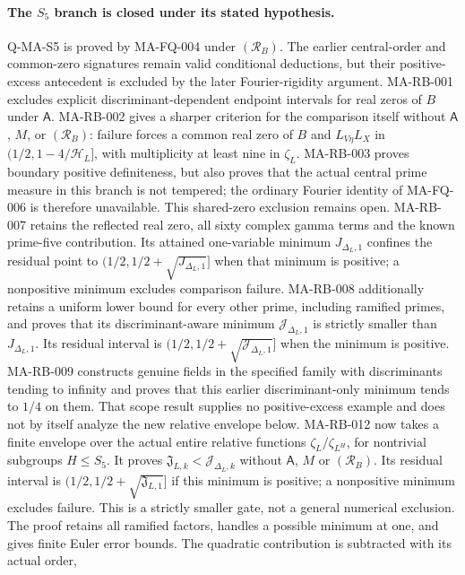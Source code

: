 \documentclass[11pt,a4paper]{article}
\begin{document}
\paragraph{The $S_5$ branch is closed under its stated hypothesis.}
Q-MA-S5 is proved by MA-FQ-004 under $(\mathcal R_B)$.
The earlier central-order and common-zero signatures remain
valid conditional deductions, but their positive-excess
antecedent is excluded by the later Fourier-rigidity argument.
MA-RB-001 excludes explicit discriminant-dependent endpoint
intervals for real zeros of $B$ under $\mathsf A$.
MA-RB-002 gives a sharper criterion for the comparison itself
without $\mathsf A$, $M$, or $(\mathcal R_B)$: failure forces a
common real zero of $B$ and $L_{V\eta}L_X$ in
$(1/2,1-4/\mathcal H_L]$, with multiplicity at least nine in
$\zeta_L$. MA-RB-003 proves boundary positive definiteness, but
also proves that the actual central prime measure in this branch
is not tempered; the ordinary Fourier identity of MA-FQ-006 is
therefore unavailable. This shared-zero exclusion remains open.
MA-RB-007 retains the reflected real zero, all sixty complex
gamma terms and the known prime-five contribution. Its attained
one-variable minimum $J_{\Delta_L,1}$ confines the residual
point to $(1/2,1/2+\sqrt{J_{\Delta_L,1}}]$ when that minimum
is positive; a nonpositive minimum excludes comparison failure.
MA-RB-008 additionally retains a uniform lower bound for every
other prime, including ramified primes, and proves that its
discriminant-aware minimum $\mathcal J_{\Delta_L,1}$ is strictly
smaller than $J_{\Delta_L,1}$. Its residual interval is
$(1/2,1/2+\sqrt{\mathcal J_{\Delta_L,1}}]$ when the minimum
is positive. MA-RB-009 constructs genuine fields in the specified
family with discriminants tending to infinity and proves that
this earlier discriminant-only minimum tends to $1/4$ on them.
That scope result supplies no positive-excess example and does
not by itself analyze the new relative envelope below.
MA-RB-012 now takes a finite envelope over the actual entire
relative functions $\zeta_L/\zeta_{L^H}$, for nontrivial
subgroups $H\le S_5$. It proves
$\mathfrak J_{L,k}<\mathcal J_{\Delta_L,k}$ without
$\mathsf A$, $M$ or $(\mathcal R_B)$. Its residual
interval is $(1/2,1/2+\sqrt{\mathfrak J_{L,1}}]$ if this
minimum is positive; a nonpositive minimum excludes failure.
This is a strictly smaller gate, not a general numerical
exclusion. The proof retains all ramified factors, handles a
possible minimum at one, and gives finite Euler error bounds.
The quadratic contribution is subtracted with its actual order,
\end{document}
